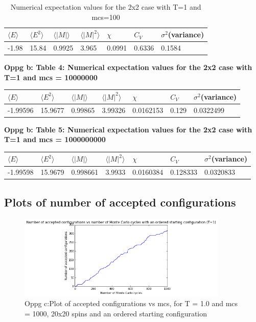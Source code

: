 \documentclass[twocolumn]{article}
\begin{document}
\newpage

\begin{table}
\centering
\caption{Numerical expectation values for the 2x2 case with T=1 and mcs=100}
\begin{tabular}{l | l | l | l | l | l | l}
    \hline
    \hline
    $\langle E \rangle$ & $\langle E^2 \rangle$ & $\langle |M| \rangle$ & $\langle |M|^2 \rangle$ & $\chi$ & $C_V$ & $\sigma^2$(variance)\\
    \hline 
    -1.98 & 15.84 & 0.9925 & 3.965 & 0.0991 & 0.6336 & 0.1584 \\
    \hline
    \hline
\end{tabular}
\end{table}
\centering
\textbf{Oppg b: Table 4: Numerical expectation values for the 2x2 case with T=1 and mcs = 10000000}
\newline
\bigskip
\resizebox{3cm} {
\begin{tabular}{|| l | l | l | l | l | l | l ||}
    \centering
    \hline
    $\langle E \rangle$ & $\langle E^2 \rangle$ & $\langle |M| \rangle$ & $\langle |M|^2 \rangle$ & $\chi$ & $C_V$ & $\sigma^2$(variance)\\
    \hline 
    -1.99596 & 15.9677 & 0.99865 & 3.99326 & 0.0162153 & 0.129 & 0.0322499 \\
    \hline
\end{tabular}
}
\centering
\textbf{Oppg b: Table 5: Numerical expectation values for the 2x2 case with T=1 and mcs = 1000000000}
\newline
\centering
\bigskip

\resizebox{3cm} {
\begin{tabular}{|| l | l | l | l | l | l | l ||}
    \hline
    $\langle E \rangle$ & $\langle E^2 \rangle$ & $\langle |M| \rangle$ & $\langle |M|^2 \rangle$ & $\chi$ & $C_V$ & $\sigma^2$(variance)\\
    \hline 
    -1.99598 & 15.9679 & 0.998661 & 3.9933 & 0.0160384 & 0.128333 & 0.0320833 \\
    \hline
\end{tabular}
}

\centering\subsection{Plots of number of accepted configurations}

\begin{figure}[h!]
  \centering
  \caption{Oppg c:Plot of accepted configurations vs mcs, for T = 1.0 and mcs = 1000, 20x20 spins and an ordered starting configuration}
  \includegraphics[width=10cm]{configs_plot_1.png}
\end{figure}
\end{document}
